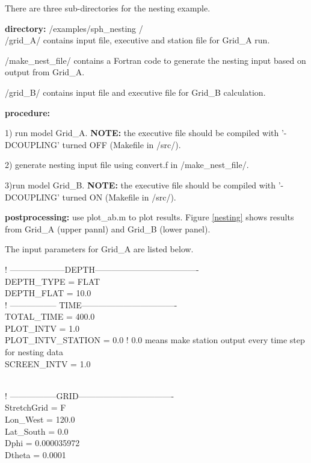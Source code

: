 \documentclass[11pt]{article}
\begin{document}
There are three sub-directories for the nesting example. 

\vspace{0.2cm}
\noindent
{\bf directory:}  /examples/sph\_nesting / \\

/grid\_A/ contains input file, executive and station file for Grid\_A run.

/make\_nest\_file/ contains a Fortran code to generate the nesting input based on output from Grid\_A.

/grid\_B/ contains input file and executive file for Grid\_B calculation.

\vspace{0.2cm}
\noindent
{\bf procedure: } 

1) run model Grid\_A. {\bf NOTE:} the executive file should be compiled with '-DCOUPLING' turned OFF (Makefile in /src/).

2) generate nesting input file using convert.f in /make\_nest\_file/.

3)run model Grid\_B.   {\bf NOTE:} the executive file should be compiled with '-DCOUPLING' turned ON (Makefile in /src/).

\vspace{0.2cm}
\noindent
{\bf postprocessing: } use plot\_ab.m to plot results. Figure \ref{nesting} shows results from Grid\_A (upper pannl) and Grid\_B (lower panel).


The input parameters for Grid\_A are listed below.

\vspace*{0.5cm}
  ! --------------------DEPTH------------------------------------- \\
DEPTH\_TYPE = FLAT\\
DEPTH\_FLAT = 10.0\\

  ! ----------------- TIME----------------------------------\\
TOTAL\_TIME = 400.0\\
PLOT\_INTV = 1.0\\
PLOT\_INTV\_STATION = 0.0 !  0.0 means make station output every time step for nesting data \\
SCREEN\_INTV = 1.0\\\

  ! -----------------GRID----------------------------------\\
  StretchGrid = F\\
Lon\_West = 120.0\\
Lat\_South = 0.0\\
Dphi = 0.000035972\\
Dtheta = 0.0001 \\
\end{document}
